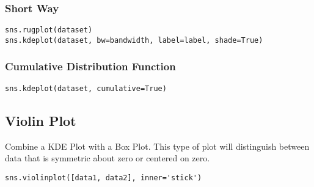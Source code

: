 %
\subsubsection{Short Way}

\begin{lstlisting}
sns.rugplot(dataset)
sns.kdeplot(dataset, bw=bandwidth, label=label, shade=True)
\end{lstlisting}

%
\subsubsection{Cumulative Distribution Function}

\begin{lstlisting}
sns.kdeplot(dataset, cumulative=True)
\end{lstlisting}

\subsection{Violin Plot}
Combine a KDE Plot with a Box Plot. This type of plot will distinguish between
data that is symmetric about zero or centered on zero.

\begin{lstlisting}
sns.violinplot([data1, data2], inner='stick')
\end{lstlisting}
